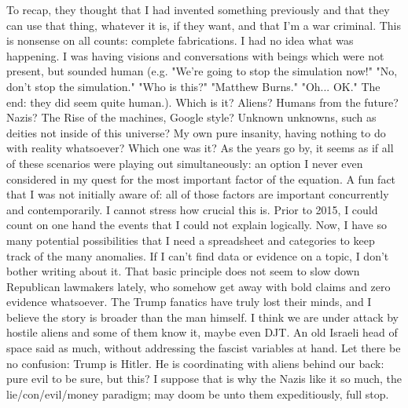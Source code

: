 \documentclass{article}
\begin{document}
\begin{multicols}{2}
To recap, they thought that I had invented something previously and that they can use that thing, whatever it is, if they want, and that I'm a war criminal. This is nonsense on all counts: complete fabrications. I had no idea what was happening. I was having visions and conversations with beings which were not present, but sounded human (e.g. "We're going to stop the simulation now!" "No, don't stop the simulation." "Who is this?" "Matthew Burns." "Oh... OK." The end: they did seem quite human.). Which is it? Aliens? Humans from the future? Nazis? The Rise of the machines, Google style? Unknown unknowns, such as deities not inside of this universe? My own pure insanity, having nothing to do with reality whatsoever? Which one was it? As the years go by, it seems as if all of these scenarios were playing out simultaneously: an option I never even considered in my quest for the most important factor of the equation. A fun fact that I was not initially aware of: all of those factors are important concurrently and contemporarily. I cannot stress how crucial this is. Prior to 2015, I could count on one hand the events that I could not explain logically. Now, I have so many potential possibilities that I need a spreadsheet and categories to keep track of the many anomalies. If I can't find data or evidence on a topic, I don't bother writing about it. That basic principle does not seem to slow down Republican lawmakers lately, who somehow get away with bold claims and zero evidence whatsoever. The Trump fanatics have truly lost their minds, and I believe the story is broader than the man himself. I think we are under attack by hostile aliens and some of them know it, maybe even DJT. An old Israeli head of space said as much, without addressing the fascist variables at hand. Let there be no confusion: Trump is Hitler. He is coordinating with aliens behind our back: pure evil to be sure, but this? I suppose that is why the Nazis like it so much, the lie/con/evil/money paradigm; may doom be unto them expeditiously, full stop.

\end{multicols}
\end{document}
